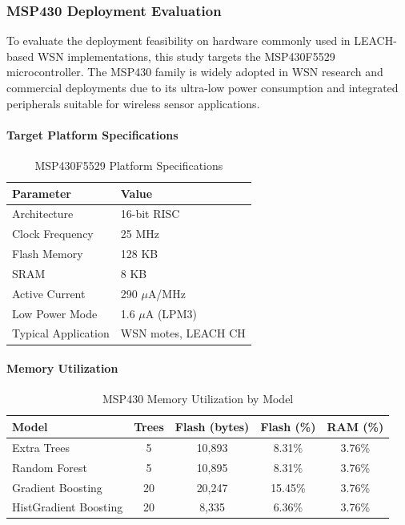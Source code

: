 \subsubsection{MSP430 Deployment Evaluation}

To evaluate the deployment feasibility on hardware commonly used in LEACH-based WSN implementations, this study targets the MSP430F5529 microcontroller. The MSP430 family is widely adopted in WSN research and commercial deployments due to its ultra-low power consumption and integrated peripherals suitable for wireless sensor applications.

\paragraph{Target Platform Specifications}

\begin{table}[htbp]
\centering
\caption{MSP430F5529 Platform Specifications}
\label{tab:msp430_specs}
\begin{tabular}{ll}
\hline
\textbf{Parameter} & \textbf{Value} \\
\hline
Architecture & 16-bit RISC \\
Clock Frequency & 25 MHz \\
Flash Memory & 128 KB \\
SRAM & 8 KB \\
Active Current & 290 $\mu$A/MHz \\
Low Power Mode & 1.6 $\mu$A (LPM3) \\
Typical Application & WSN motes, LEACH CH \\
\hline
\end{tabular}
\end{table}

\paragraph{Memory Utilization}

\begin{table}[htbp]
\centering
\caption{MSP430 Memory Utilization by Model}
\label{tab:msp430_memory}
\begin{tabular}{lcccc}
\hline
\textbf{Model} & \textbf{Trees} & \textbf{Flash (bytes)} & \textbf{Flash (\%)} & \textbf{RAM (\%)} \\
\hline
Extra Trees & 5 & 10,893 & 8.31\% & 3.76\% \\
Random Forest & 5 & 10,895 & 8.31\% & 3.76\% \\
Gradient Boosting & 20 & 20,247 & 15.45\% & 3.76\% \\
HistGradient Boosting & 20 & 8,335 & 6.36\% & 3.76\% \\
\hline
\end{tabular}
\end{table}

